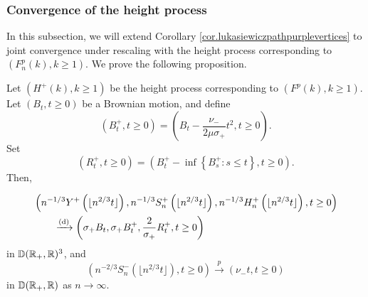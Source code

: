 \subsubsection{Convergence of the height process}\label{subsubsec.convheightprocess}
In this subsection, we will extend Corollary \ref{cor.lukasiewiczpathpurplevertices} to joint convergence under rescaling with the height process corresponding to $(F^p_n(k),k\geq 1)$. We prove the following proposition. 
\begin{proposition}\label{prop.convheightprocesspurple}
Let $(H^{+}(k),k\geq 1)$ be the height process corresponding to $(F^p(k),k\geq 1)$. Let $(B_t,t\geq 0)$ be a Brownian motion, and define 
$$({B}^+_t,t\geq 0)=\left(B_t-\frac{\nu_-}{2\mu\sigma_+}t^2,t\geq 0\right).$$ 
Set $$(R^+_t,t\geq 0)=\left({B}^+_t-\inf\left\{{B}^+_s: s\leq t\right\},t\geq 0 \right).$$
Then,

\begin{align*}&\left(n^{-1/3}Y^{+}\left(\lfloor n^{2/3}t\rfloor\right), n^{-1/3}S^{+}_n\left(\lfloor n^{2/3}t\rfloor\right),n^{-1/3}H^{+}_n\left(\lfloor n^{2/3}t\rfloor\right), t\geq 0\right) \\
&\qquad \xrightarrow[]{\mathrm{(d)}}\left(\sigma_+B_t,\sigma_+{B}^+_t, \frac{2}{\sigma_+} R^+_t,  t\geq 0\right)\end{align*}
 in ${\mathbb D}({\mathbb R}_+,{\mathbb R})^3$, and 
 $$\left(n^{-2/3}S^{-}_n\left(\lfloor n^{2/3}t\rfloor\right),t\geq 0\right)\overset{p}{\to}\left(\nu_- t,t\geq 0\right)$$
 in ${\mathbb D}({\mathbb R}_+,{\mathbb R})$ as $n\to\infty$.
\end{proposition}

